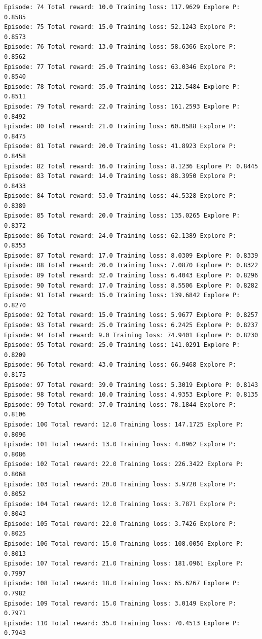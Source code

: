 \documentclass[11pt]{article}
\begin{document}
\begin{Verbatim}[commandchars=\\\{\}]
Episode: 74 Total reward: 10.0 Training loss: 117.9629 Explore P: 0.8585
Episode: 75 Total reward: 15.0 Training loss: 52.1243 Explore P: 0.8573
Episode: 76 Total reward: 13.0 Training loss: 58.6366 Explore P: 0.8562
Episode: 77 Total reward: 25.0 Training loss: 63.0346 Explore P: 0.8540
Episode: 78 Total reward: 35.0 Training loss: 212.5484 Explore P: 0.8511
Episode: 79 Total reward: 22.0 Training loss: 161.2593 Explore P: 0.8492
Episode: 80 Total reward: 21.0 Training loss: 60.0588 Explore P: 0.8475
Episode: 81 Total reward: 20.0 Training loss: 41.8923 Explore P: 0.8458
Episode: 82 Total reward: 16.0 Training loss: 8.1236 Explore P: 0.8445
Episode: 83 Total reward: 14.0 Training loss: 88.3950 Explore P: 0.8433
Episode: 84 Total reward: 53.0 Training loss: 44.5328 Explore P: 0.8389
Episode: 85 Total reward: 20.0 Training loss: 135.0265 Explore P: 0.8372
Episode: 86 Total reward: 24.0 Training loss: 62.1389 Explore P: 0.8353
Episode: 87 Total reward: 17.0 Training loss: 8.0309 Explore P: 0.8339
Episode: 88 Total reward: 20.0 Training loss: 7.0870 Explore P: 0.8322
Episode: 89 Total reward: 32.0 Training loss: 6.4043 Explore P: 0.8296
Episode: 90 Total reward: 17.0 Training loss: 8.5506 Explore P: 0.8282
Episode: 91 Total reward: 15.0 Training loss: 139.6842 Explore P: 0.8270
Episode: 92 Total reward: 15.0 Training loss: 5.9677 Explore P: 0.8257
Episode: 93 Total reward: 25.0 Training loss: 6.2425 Explore P: 0.8237
Episode: 94 Total reward: 9.0 Training loss: 74.9401 Explore P: 0.8230
Episode: 95 Total reward: 25.0 Training loss: 141.0291 Explore P: 0.8209
Episode: 96 Total reward: 43.0 Training loss: 66.9468 Explore P: 0.8175
Episode: 97 Total reward: 39.0 Training loss: 5.3019 Explore P: 0.8143
Episode: 98 Total reward: 10.0 Training loss: 4.9353 Explore P: 0.8135
Episode: 99 Total reward: 37.0 Training loss: 78.1844 Explore P: 0.8106
Episode: 100 Total reward: 12.0 Training loss: 147.1725 Explore P: 0.8096
Episode: 101 Total reward: 13.0 Training loss: 4.0962 Explore P: 0.8086
Episode: 102 Total reward: 22.0 Training loss: 226.3422 Explore P: 0.8068
Episode: 103 Total reward: 20.0 Training loss: 3.9720 Explore P: 0.8052
Episode: 104 Total reward: 12.0 Training loss: 3.7871 Explore P: 0.8043
Episode: 105 Total reward: 22.0 Training loss: 3.7426 Explore P: 0.8025
Episode: 106 Total reward: 15.0 Training loss: 108.0056 Explore P: 0.8013
Episode: 107 Total reward: 21.0 Training loss: 181.0961 Explore P: 0.7997
Episode: 108 Total reward: 18.0 Training loss: 65.6267 Explore P: 0.7982
Episode: 109 Total reward: 15.0 Training loss: 3.0149 Explore P: 0.7971
Episode: 110 Total reward: 35.0 Training loss: 70.4513 Explore P: 0.7943

\end{Verbatim}
\end{document}
